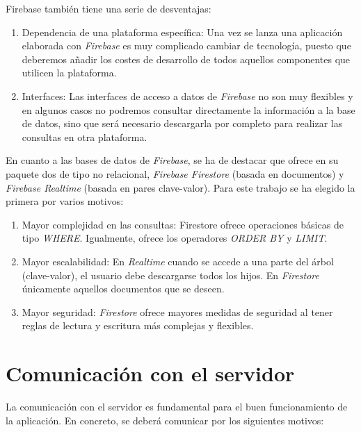 \documentclass[twoside]{report}
\begin{document}
Firebase también tiene una serie de desventajas:

\begin{enumerate}
\item Dependencia de una plataforma específica: Una vez se lanza una aplicación elaborada con \textit{Firebase} es muy complicado cambiar de tecnología, puesto que deberemos añadir los costes de desarrollo de todos aquellos componentes que utilicen la plataforma.

\item Interfaces: Las interfaces de acceso a datos de \textit{Firebase} no son muy flexibles y en algunos casos no podremos consultar directamente la información a la base de datos, sino que será necesario descargarla por completo para realizar las consultas en otra plataforma.

\end{enumerate}

En cuanto a las bases de datos de \textit{Firebase}, se ha de destacar que ofrece en su paquete dos de tipo no relacional, \textit{Firebase Firestore} (basada en documentos) y \textit{Firebase Realtime} (basada en pares clave-valor). Para este trabajo se ha elegido la primera por varios motivos:

\begin{enumerate}
\item Mayor complejidad en las consultas: Firestore ofrece operaciones básicas de tipo \textit{WHERE}. Igualmente, ofrece los operadores \textit{ORDER BY} y \textit{LIMIT}.
\item Mayor escalabilidad: En \textit{Realtime} cuando se accede a una parte del árbol (clave-valor), el usuario debe descargarse todos los hijos. En \textit{Firestore} únicamente aquellos documentos que se deseen.
\item Mayor seguridad: \textit{Firestore} ofrece mayores medidas de seguridad al tener reglas de lectura y escritura más complejas y flexibles.
\end{enumerate}

\section{Comunicación con el servidor}
La comunicación con el servidor es fundamental para el buen funcionamiento de la aplicación. En concreto, se deberá comunicar por los siguientes motivos:
\end{document}
